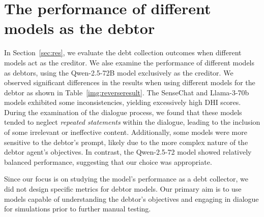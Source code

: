 \section{The performance of different models as the debtor}\label{sec:model_deb}


In Section~\ref{sec:res}, we evaluate the debt collection outcomes when different models act as the creditor. We alse examine the performance of different models as debtors, using the Qwen-2.5-72B model exclusively as the creditor. We observed significant differences in the results when using different models for the debtor as shown in Table~\ref{img:reverseresult}. The SenseChat and Llama-3-70b models exhibited some inconsistencies, yielding excessively high DHI scores. During the examination of the dialogue process, we found that these models tended to neglect \textit{repeated statements} within the dialogue, leading to the inclusion of some irrelevant or ineffective content. Additionally, some models were more sensitive to the debtor’s prompt, likely due to the more complex nature of the debtor agent’s objectives. In contrast, the Qwen-2.5-72 model showed relatively balanced performance, suggesting that our choice was appropriate.

Since our focus is on studying the model’s performance as a debt collector, we did not design specific metrics for debtor models. Our primary aim is to use models capable of understanding the debtor’s objectives and engaging in dialogue for simulations prior to further manual testing.

